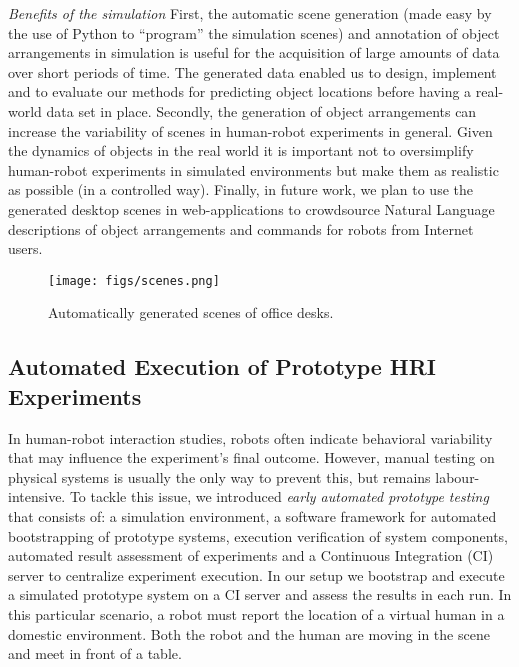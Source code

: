 \documentclass{llncs}
\begin{document}
\emph{Benefits of the simulation} First, the automatic scene generation (made
easy by the use of Python to ``program'' the simulation scenes) and annotation
of object arrangements in simulation is useful for the acquisition of large
amounts of data over short periods of time. The generated data enabled us to
design, implement and to evaluate our methods for predicting object locations
before having a real-world data set in place. Secondly, the generation of object
arrangements can increase the variability of scenes in human-robot experiments
in general. Given the dynamics of objects in the real world it is important not
to oversimplify human-robot experiments in simulated environments but make them
as realistic as possible (in a controlled way). Finally, in future work, we plan
to use the generated desktop scenes in web-applications to crowdsource Natural
Language descriptions of object arrangements and commands for robots from
Internet users.

\begin{figure}[t]
  \centering
  \texttt{[image: figs/scenes.png]}
  \caption{Automatically generated scenes of office desks.}
  \label{fig:simulated-desktop-scenes}
\end{figure}


\subsection{Automated Execution of Prototype HRI Experiments}
\label{sc:ci}

In human-robot interaction studies, robots often indicate behavioral variability
that may influence the experiment's final outcome.  However, manual testing on
physical systems is usually the only way to prevent this, but remains
labour-intensive. To tackle this issue, we introduced \emph{early automated
prototype testing}~\cite{2645922} that consists of: a simulation environment, a
software framework for automated bootstrapping of prototype systems, execution
verification of system components, automated result assessment of experiments
and a Continuous Integration (CI) server to centralize experiment execution. In
our setup we bootstrap and execute a simulated prototype system on a CI server
and assess the results in each run. In this particular scenario, a robot must
report the location of a virtual human in a domestic environment. Both the
robot and the human are moving in the scene and meet in front of a table.
\end{document}
